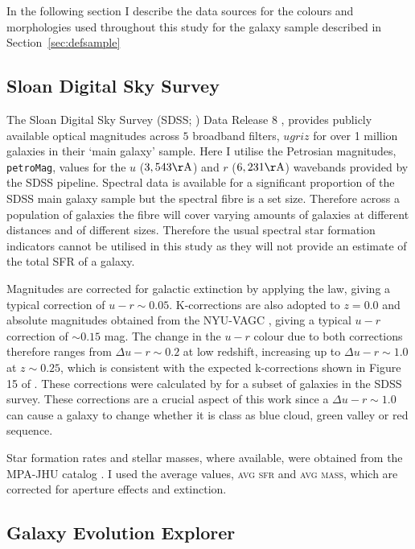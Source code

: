 In the following section I describe the data sources for the colours and morphologies used throughout this study for the galaxy sample described in Section~\ref{sec:defsample}

\subsection{Sloan Digital Sky Survey}\label{sec:sdssintro}

The Sloan Digital Sky Survey (SDSS; \citealt{york00}) Data Release 8 \citep{Aihara11}, provides publicly available optical magnitudes across $5$ broadband filters, $ugriz$ for over 1 million galaxies in their `main galaxy' sample. Here I utilise the Petrosian magnitudes, {\tt petroMag}, values for the $u$ ($3,543\rm{\AA}$) and $r$ ($6,231\rm{\AA}$) wavebands provided by the SDSS pipeline. Spectral data is available for a significant proportion of the SDSS main galaxy sample but the spectral fibre is a set size. Therefore across a population of galaxies the fibre will cover varying amounts of galaxies at different distances and of different sizes. Therefore the usual spectral star formation indicators cannot be utilised in this study as they will not provide an estimate of the total SFR of a galaxy. 

Magnitudes are corrected for galactic extinction \citep{Oh11} by applying the \citet{Cardelli89} law, giving a typical correction of $u-r \sim 0.05$. K-corrections are also adopted to $z=0.0$ and absolute magnitudes obtained from the NYU-VAGC \citep{Blanton05, padmanabhan08, blanton07}, giving a typical $u-r$ correction of $\sim 0.15$ mag. The change in the $u-r$ colour due to both corrections therefore ranges from $\Delta u-r \sim 0.2$ at low redshift, increasing up to $\Delta u-r \sim 1.0$ at $z \sim 0.25$, which is consistent with the expected k-corrections shown in Figure 15 of \citet{blanton07}. These corrections were calculated by \citet{Bamford09} for a subset of galaxies in the SDSS survey. These corrections are a crucial aspect of this work since a $\Delta u-r \sim 1.0$ can cause a galaxy to change whether it is class as blue cloud, green valley or red sequence.

Star formation rates and stellar masses, where available, were obtained from the MPA-JHU catalog \citep{kauffmann03, brinchmann04}. I used the average values, \textsc{avg sfr} and \textsc{avg mass}, which are corrected for aperture effects and extinction.

\subsection{Galaxy Evolution Explorer}\label{sec:galexintro}


